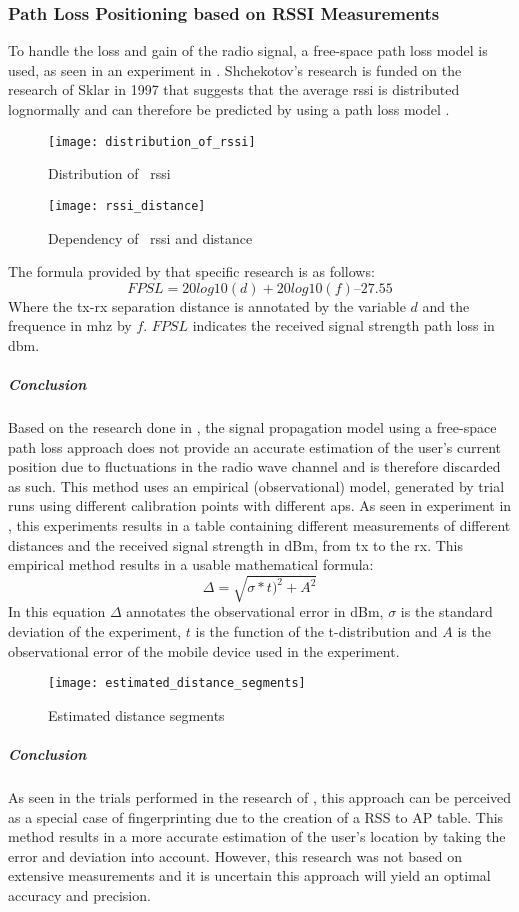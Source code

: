 \subsubsection{Path Loss Positioning based on RSSI Measurements}
To handle the loss and gain of the radio signal, a free-space path loss model is used, as seen in an experiment in \cite[p.178]{Shchekotov}. Shchekotov's research is funded on the research of Sklar in 1997 that suggests that the average \acrshort{rssi} is distributed lognormally and can therefore be predicted by using a path loss model \cite[p.16]{S2016}.
\begin{figure}[h!]
\centering
\texttt{[image: distribution\_of\_rssi]}
\caption{Distribution of ~\acrlong{rssi} ~\cite[p.16]{S2016}}
\label{fig:distribution_rssi}
\end{figure}
\begin{figure}[h!]
\centering
\texttt{[image: rssi\_distance]}
\caption{Dependency of ~\acrlong{rssi} and distance ~\cite[p.61]{Mautz}}
\label{fig:rssi_distance}
\end{figure}
The formula provided by that specific research is as follows:
\begin{equation}
FPSL = 20log10(d) + 20log10(f) – 27.55
\end{equation}
Where the \acrlong{tx}-\acrlong{rx} separation distance is annotated by the variable $d$ and the frequence in \acrfull{mhz} by $f$. $FPSL$ indicates the received signal strength path loss in \acrfull{dbm}.
\subparagraph{Conclusion}
Based on the research done in \cite{Shchekotov}, the signal propagation model using a free-space path loss approach does not provide an accurate estimation of the user's current position due to fluctuations in the radio wave channel and is therefore discarded as such.
This method uses an empirical (observational) model, generated by trial runs using different calibration points with different \acrlong{ap}s. As seen in experiment in \cite{Shchekotov}, this experiments results in a table containing different measurements of different distances and the received signal strength in dBm, from \acrlong{tx} to the \acrlong{rx}. This empirical method results in a usable mathematical formula:
\begin{equation}
\Delta = \sqrt{\sigma * t)^2 + A^2}
\end{equation}
In this equation $\Delta$ annotates the observational error in dBm, $\sigma$ is the standard deviation of the experiment, $t$ is the function of the t-distribution and $A$ is the observational error of the mobile device used in the experiment.
\begin{figure}[h!]
\centering
\texttt{[image: estimated\_distance\_segments]}
\caption{Estimated distance segments ~\cite[p.179]{Shchekotov}}
\label{fig:estimated_distance_segments}
\end{figure}
\subparagraph{Conclusion}
As seen in the trials performed in the research of \cite{Shchekotov}, this approach can be perceived as a special case of fingerprinting due to the creation of a RSS to AP table. This method results in a more accurate estimation of the user's location by taking the error and deviation into account. However, this research was not based on extensive measurements and it is uncertain this approach will yield an optimal accuracy and precision.
